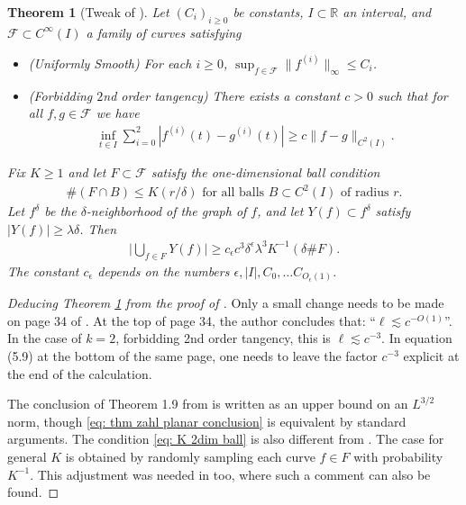 \documentclass[12pt]{amsart}
\numberwithin{equation}{section}
\newtheorem{theorem}{Theorem}
\newcommand{\R}{\mathbb{R}}
\newcommand{\1}{\mathbbm{1}}
\begin{document}
\begin{theorem}[Tweak of ]\label{thm: zahl planar tweak}
    Let $(C_i)_{i\geq 0}$ be constants, $I \subset \R$ an interval, and $\mathcal F \subset C^\infty(I)$ a family of curves satisfying 
    \begin{itemize}
        \item (Uniformly Smooth) For each $i \geq 0$, $\sup_{f \in \mathcal F} \| f^{(i)} \|_\infty \leq C_i$.
        \item  (Forbidding $2$nd order tangency) There exists a constant $c > 0$ such that for all $f,g \in \mathcal F$ we have
        \begin{align}\label{eq: forbid 2nd order tang}
            \inf_{t \in I} \sum_{i=0}^2 |f^{(i)}(t) - g^{(i)}(t)| \geq c \|f - g\|_{C^2(I)}. 
        \end{align}
    \end{itemize}
    Fix $K \geq 1$ and let $F \subset \mathcal F$ satisfy the one-dimensional ball condition 
    \begin{align}\label{eq: K 2dim ball}
        \# (F \cap B) \leq K(r/\delta) \text{ for all balls $B \subset C^2(I)$ of radius $r$}.
    \end{align}
    Let $f^\delta$ be the $\delta$-neighborhood of the graph of $f$, and let $Y(f) \subset f^\delta$ satisfy $|Y(f)| \geq \lambda \delta$. Then 
    \begin{align}\label{eq: thm zahl planar conclusion}
        \Big |\bigcup_{f \in F } Y(f)\Big | \geq c_\epsilon c^3 \delta^\epsilon \lambda^3 K^{-1} (\delta \# F). 
    \end{align}
    The constant $c_\epsilon$ depends on the numbers $\epsilon, |I|, C_0,\ldots C_{O_{\epsilon}(1)}$.
\end{theorem}

\begin{proof}[Deducing Theorem \ref{thm: zahl planar tweak} from the proof of ]
    Only a small change needs to be made on page 34 of \cite{zahlPlanar}. At the top of page 34, the author concludes that: ``$\ell \lesssim c^{-O(1)}$''. In the case of $k = 2$, forbidding 2nd order tangency, this is $\ell \lesssim c^{-3}$.
    In equation (5.9) at the bottom of the same page, one needs to leave the factor $c^{-3}$ explicit at the end of the calculation.
    
    The conclusion of Theorem 1.9 from \cite{zahlPlanar} is written as an upper bound on an $L^{3/2}$ norm, though \eqref{eq: thm zahl planar conclusion} is equivalent by standard arguments. The condition \eqref{eq: K 2dim ball} is also different from \cite{zahlPlanar}. The case for general $K$ is obtained by randomly sampling each curve $f \in F$ with probability $K^{-1}$. This adjustment was needed in \cite{KWZ} too, where such a comment can also be found. 
\end{proof}
\end{document}
